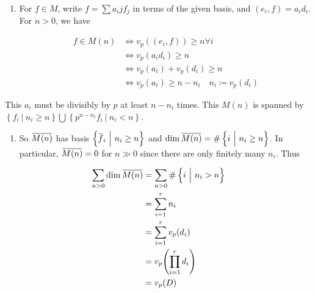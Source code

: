 \documentclass[11pt]{scrartcl}
\theoremstyle{definition}
\theoremstyle{theorem}
\theoremstyle{proof}
\newenvironment{proof}
{\pushQED{$\qed$}\pf}
{\par\popQED\endpf}
\theoremstyle{definition}
\theoremstyle{break}
\theoremstyle{problem}
\providecommand{\tightlist}{%
  \setlength{\itemsep}{0pt}\setlength{\parskip}{0pt}}
\DeclarePairedDelimiter\qty{(}{)}
\renewcommand{\qty}[1]{{\left(  {#1} \right)}}
\newcommand{\definedas}[0]{\coloneqq}
\newcommand{\suchthat}[0]{{~\mathrel{\Big|}~}}
\newcommand{\theset}[1]{\left\{{#1}\right\}}
\newcommand{\union}[0]{\bigcup}
\renewcommand{\bar}[1]{\mkern 1.5mu\overline{\mkern-1.5mu#1\mkern-1.5mu}\mkern 1.5mu}
\renewcommand{\qed}[0]{\hfill\blacksquare}
\begin{document}
\begin{proof}[of (a)]

\hfill

\begin{enumerate}
\def\labelenumi{\arabic{enumi}.}
\tightlist
\item
  For \(f\in M\), write \(f = \sum a_ij f_j\) in terms of the given
  basis, and \((e_i, f) = a_i d_i\). For \(n> 0\), we have

  \begin{center}
    \begin{align*}
    f \in M(n) & \iff v_p((e_i, f)) \geq n \forall i \\
    & \iff v_p(a_i d_i) \geq n \\
    & \iff v_p(a_i) + v_p(d_i) \geq n \\
    & \iff v_p(a_i) \geq n - n_i \quad n_i \definedas v_p(d_i)
    \end{align*}
    \end{center}
\end{enumerate}

This \(a_i\) must be divisibly by \(p\) at least \(n-n_i\) times. This
\(M(n)\) is spanned by
\(\theset{f_i \suchthat n_i \geq n} \union \theset{p^{n-n_i}f_i \suchthat n_i < n}\).

\begin{enumerate}
\def\labelenumi{\arabic{enumi}.}
\setcounter{enumi}{1}
\tightlist
\item
  So \(\bar{M(n)}\) has basis \(\theset{\bar f_i \suchthat n_i \geq n}\)
  and \(\dim \bar{M(n)} = \# \theset{i \suchthat n_i \geq n}\). In
  particular, \(\bar{M(n)} = 0\) for \(n\gg 0\) since there are only
  finitely many \(n_i\). Thus
\end{enumerate}

\begin{center}
  \begin{align*}
  \sum_{n > 0} \dim \bar{M(n)}
  &= \sum_{n > 0} \# \theset{i \suchthat n_i > n} \\
  &= \sum_{i=1}^r n_i \\
  &= \sum_{i=1}^r v_p (d_i) \\
  &= v_p \qty{ \prod_{i=1}^r d_i } \\
  &= v_p(D)
  \end{align*}
  \end{center}

\end{proof}
\end{document}
